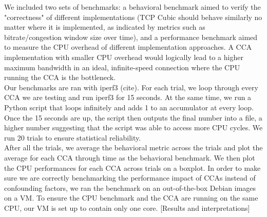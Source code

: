 \documentclass[../main.tex]{subfiles}
\begin{document}
We included two sets of benchmarks: a behavioral benchmark aimed to verify the "correctness" of different implementations (TCP Cubic should behave similarly no matter where it is implemented, as indicated by metrics such as bitrate/congestion window size over time), and a performance benchmark aimed to measure the CPU overhead of different implementation approaches. A CCA implementation with smaller CPU overhead would logically lead to a higher maximum bandwidth in an ideal, infinite-speed connection where the CPU running the CCA is the bottleneck. \\
Our benchmarks are ran with iperf3 (cite). For each trial, we loop through every CCA we are testing and run iperf3 for 15 seconds. At the same time, we run a Python script that loops infinitely and adds 1 to an accumulator at every loop. Once the 15 seconds are up, the script then outputs the final number into a file, a higher number suggesting that the script was able to access more CPU cycles. We run 20 trials to ensure statistical reliability. \\
After all the trials, we average the behavioral metric across the trials and plot the average for each CCA through time as the behavioral benchmark. We then plot the CPU performances for each CCA across trials on a boxplot. In order to make sure we are correctly benchmarking the performance impact of CCAs instead of confounding factors, we ran the benchmark on an out-of-the-box Debian images on a VM. To ensure the CPU benchmark and the CCA are running on the same CPU, our VM is set up to contain only one core. [Results and interpretations]
\end{document}
